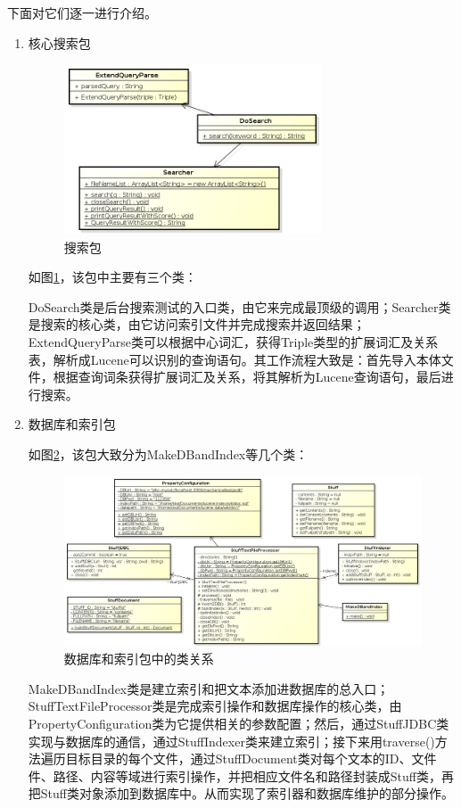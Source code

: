 \documentclass[12pt,a4paper]{article}
\begin{document}
	下面对它们逐一进行介绍。
	
	\begin{enumerate}
	\item 核心搜索包
	
	\begin{figure}[htbp] 
	\centering\includegraphics[width=3in]{fig/SearchPackage.png} 
	\caption{搜索包}\label{fig:搜索包}
	\end{figure}
	
	如图\ref{fig:搜索包}，该包中主要有三个类：
	
	DoSearch类是后台搜索测试的入口类，由它来完成最顶级的调用；Searcher类是搜索的核心类，由它访问索引文件并完成搜索并返回结果；ExtendQueryParse类可以根据中心词汇，获得Triple类型的扩展词汇及关系表，解析成Lucene可以识别的查询语句。其工作流程大致是：首先导入本体文件，根据查询词条获得扩展词汇及关系，将其解析为Lucene查询语句，最后进行搜索。
	
	\item 数据库和索引包
	
	如图\ref{fig:数据库和索引包}，该包大致分为MakeDBandIndex等几个类：
	\begin{figure}[htbp] 
	\centering\includegraphics[width=5in]{fig/dbandindexpackage.png} 
	\caption{数据库和索引包中的类关系}\label{fig:数据库和索引包}
	\end{figure}
	
	MakeDBandIndex类是建立索引和把文本添加进数据库的总入口；StuffTextFileProcessor类是完成索引操作和数据库操作的核心类，由PropertyConfiguration类为它提供相关的参数配置；然后，通过StuffJDBC类实现与数据库的通信，通过StuffIndexer类来建立索引；接下来用traverse()方法遍历目标目录的每个文件，通过StuffDocument类对每个文本的ID、文件件、路径、内容等域进行索引操作，并把相应文件名和路径封装成Stuff类，再把Stuff类对象添加到数据库中。从而实现了索引器和数据库维护的部分操作。
	

\end{enumerate}
\end{document}

